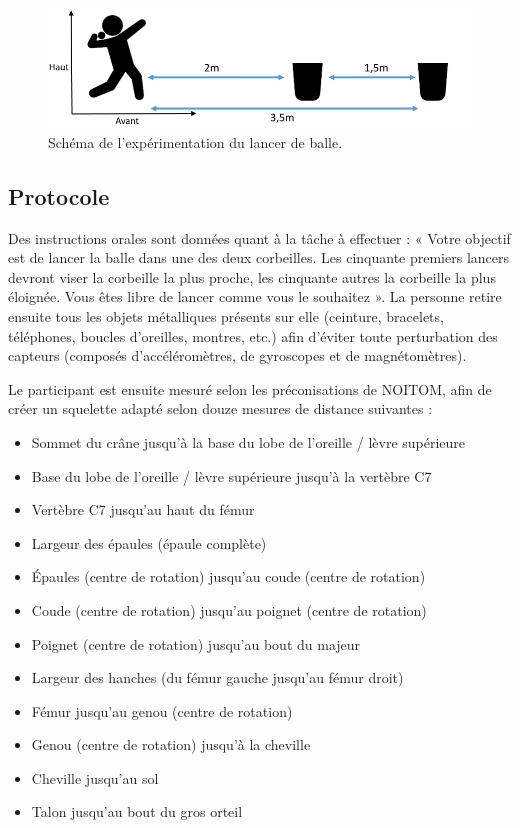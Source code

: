 \begin{figure}
	\centering
    \includegraphics[width=\textwidth]{pictures/ball_throwing.png}
    \caption{Schéma de l'expérimentation du lancer de balle.}
    \label{fig:throwing_diagram}
\end{figure}

\subsection{Protocole}
Des instructions orales sont données quant à la tâche à effectuer : « Votre objectif est de lancer la balle dans une des deux corbeilles. Les cinquante premiers lancers devront viser la corbeille la plus proche, les cinquante autres la corbeille la plus éloignée. Vous êtes libre de lancer comme vous le souhaitez ». La personne retire ensuite tous les objets métalliques présents sur elle (ceinture, bracelets, téléphones, boucles d'oreilles, montres, etc.) afin d'éviter toute perturbation des capteurs (composés d'accéléromètres, de gyroscopes et de magnétomètres).

Le participant est ensuite mesuré selon les préconisations de NOITOM, afin de créer un squelette adapté selon douze mesures de distance suivantes :
\begin{itemize}
	\item Sommet du crâne jusqu'à la base du lobe de l'oreille / lèvre supérieure
	\item Base du lobe de l'oreille / lèvre supérieure jusqu'à la vertèbre C7
	\item Vertèbre C7 jusqu'au haut du fémur
	\item Largeur des épaules (épaule complète)
	\item Épaules (centre de rotation) jusqu'au coude (centre de rotation)
	\item Coude (centre de rotation) jusqu'au poignet (centre de rotation)
	\item Poignet (centre de rotation) jusqu'au bout du majeur
	\item Largeur des hanches (du fémur gauche jusqu'au fémur droit)
	\item Fémur jusqu'au genou (centre de rotation)
	\item Genou (centre de rotation) jusqu'à la cheville
	\item Cheville jusqu'au sol
	\item Talon jusqu'au bout du gros orteil
\end{itemize}

